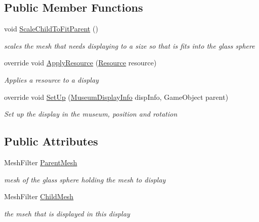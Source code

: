 \subsection*{Public Member Functions}
\begin{DoxyCompactItemize}
\item 
void \mbox{\hyperlink{class_mesh_display_a94176ce6e76cc683336051b49573ab1f}{Scale\+Child\+To\+Fit\+Parent}} ()
\begin{DoxyCompactList}\small\item\em scales the mesh that needs displaying to a size so that is fits into the glass sphere \end{DoxyCompactList}\item 
override void \mbox{\hyperlink{class_mesh_display_aff3b19b74dd530fdf299b4feee319691}{Apply\+Resource}} (\mbox{\hyperlink{class_resource}{Resource}} resource)
\begin{DoxyCompactList}\small\item\em Applies a resource to a display \end{DoxyCompactList}\item 
override void \mbox{\hyperlink{class_mesh_display_adb19ca4d076a93df64d1c035663fce0f}{Set\+Up}} (\mbox{\hyperlink{class_museum_display_info}{Museum\+Display\+Info}} disp\+Info, Game\+Object parent)
\begin{DoxyCompactList}\small\item\em Set up the display in the museum, position and rotation \end{DoxyCompactList}\end{DoxyCompactItemize}
\subsection*{Public Attributes}
\begin{DoxyCompactItemize}
\item 
Mesh\+Filter \mbox{\hyperlink{class_mesh_display_a112cd7fd6e19ed52906cbb4240dc6735}{Parent\+Mesh}}
\begin{DoxyCompactList}\small\item\em mesh of the glass sphere holding the mesh to display \end{DoxyCompactList}\item 
Mesh\+Filter \mbox{\hyperlink{class_mesh_display_aef69e30c103e4ccea952b87876384d6d}{Child\+Mesh}}
\begin{DoxyCompactList}\small\item\em the mseh that is displayed in this display \end{DoxyCompactList}\end{DoxyCompactItemize}
